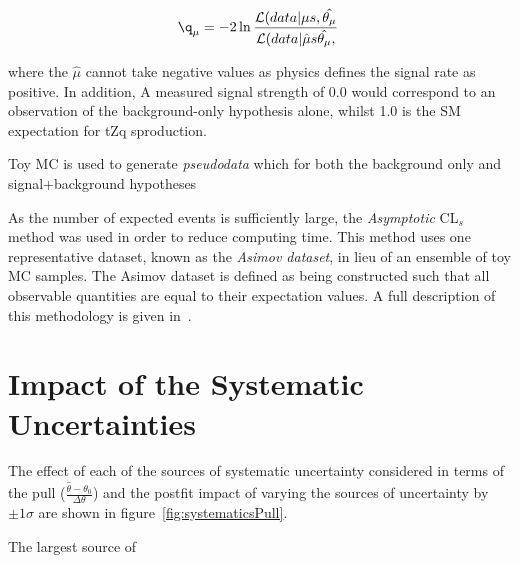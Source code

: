 \begin{equation}
\q_{\mu} =  -2 \ln \frac{ \mathcal{L}(data | \mu s , \hat{\theta_{\mu}}}{ \mathcal{L}(data | \hat{\mu} s \hat{\theta_{\mu}},  } \;
\label{eq:testStatistic}
\end{equation}



where the
$\hat{\mu}$ 
cannot take negative values as physics defines the signal rate as positive.
In addition, 
A measured signal strength of 0.0 would correspond to an observation of the background-only hypothesis alone, whilst 1.0 is the SM expectation for tZq sproduction.


Toy MC is used to generate \emph{pseudodata} which for both the background only and signal+background hypotheses 

As the number of expected events is sufficiently large, the \emph{Asymptotic} CL$_{s}$ method was used in order to reduce computing time.
This method uses one representative dataset, known as the \emph{Asimov dataset}, in lieu of an ensemble of toy MC samples.
The Asimov dataset is defined as being constructed such that all observable quantities are equal to their expectation values.
A full description of this methodology is given in~\cite{Cowan:2010js}.

\section{Impact of the Systematic Uncertainties}\label{sec:uncertainitiesImpact}
The effect of each of the sources of systematic uncertainty considered in terms of the pull ($\frac{ \hat{\theta} - \theta_{0} }{\Delta \theta}$) and the postfit impact of varying the sources of uncertainty by $\pm 1 \sigma$ are shown in figure~\ref{fig:systematicsPull}.

The largest source of 

